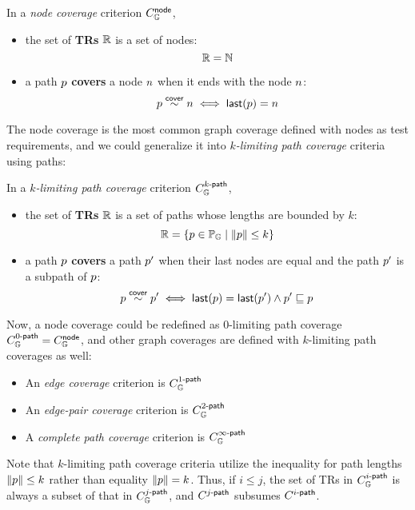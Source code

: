 
\begin{definition}\label{def:node-cov} In a \textit{node
  coverage} criterion $C_{\mathbb{G}}^{\textsf{node}}$,
  \begin{itemize}
    \item the set of \textbf{TRs} $\mathbb{R}$ is a set of nodes:
      \[
        \mathbb{R} = \mathbb{N}
      \]
    \item a path $p$ \textbf{covers} a node $n$ when it ends with the
      node $n$:
      \[
        p \overset{\textsf{cover}}{\sim} n \iff \textsf{last}(p) = n
      \]
  \end{itemize}
\end{definition}


The node coverage is the most common graph coverage defined with nodes as test
requirements, and we could generalize it into \textit{$k$-limiting path
coverage} criteria using paths:


\begin{definition}\label{def:k-path-cov}
  In a \textit{$k$-limiting path coverage} criterion $C_{\mathbb{G}}^{{k}\textsf{-path}}$,
  \begin{itemize}
    \item the set of \textbf{TRs} $\mathbb{R}$ is a set of
      paths whose lengths are bounded by $k$:
      \[
        \mathbb{R} = \{ p \in \mathbb{P}_{\mathbb{G}} \mid \lVert{p}\rVert \leq k \}
      \]
    \item a path $p$ \textbf{covers} a path $p'$ when their last nodes are
      equal and the path $p'$ is a subpath of $p$:
      \[
        p \overset{\textsf{cover}}{\sim} p'
        \iff
        \textsf{last}(p) = \textsf{last}(p') \wedge p' \sqsubseteq p
      \]
  \end{itemize}
\end{definition}


Now, a node coverage could be redefined as $0$-limiting path coverage
$C_{\mathbb{G}}^{{0}\textsf{-path}} = C_{\mathbb{G}}^{\textsf{node}}$, and other graph coverages are defined
with $k$-limiting path coverages as well:
\begin{itemize}
  \item An \textit{edge coverage} criterion is
    $C_{\mathbb{G}}^{{1}\textsf{-path}}$
  \item An \textit{edge-pair coverage} criterion is
    $C_{\mathbb{G}}^{{2}\textsf{-path}}$
  \item A \textit{complete path coverage} criterion is
    $C_{\mathbb{G}}^{{\infty}\textsf{-path}}$
\end{itemize}
%
Note that $k$-limiting path coverage criteria utilize the inequality for path
lengths $\lVert{p}\rVert \leq k$ rather than equality $\lVert{p}\rVert = k$.
%
Thus, if $i \leq j$, the set of TRs in $C_{\mathbb{G}}^{{i}\textsf{-path}}$ is always a subset
of that in $C_{\mathbb{G}}^{{j}\textsf{-path}}$, and $C_{}^{{j}\textsf{-path}}$ subsumes
$C_{}^{{i}\textsf{-path}}$.

